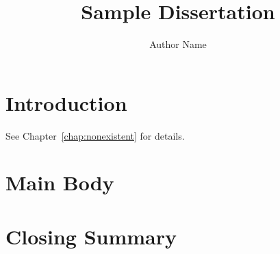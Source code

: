 \documentclass{ufdissertation}
\title{Sample Dissertation}
\author{Author Name}
\begin{document}
\chapter{Introduction}
\label{chap:intro}
See Chapter~\ref{chap:nonexistent} for details.
\chapter{Main Body}
\chapter{Closing Summary}
\end{document}
